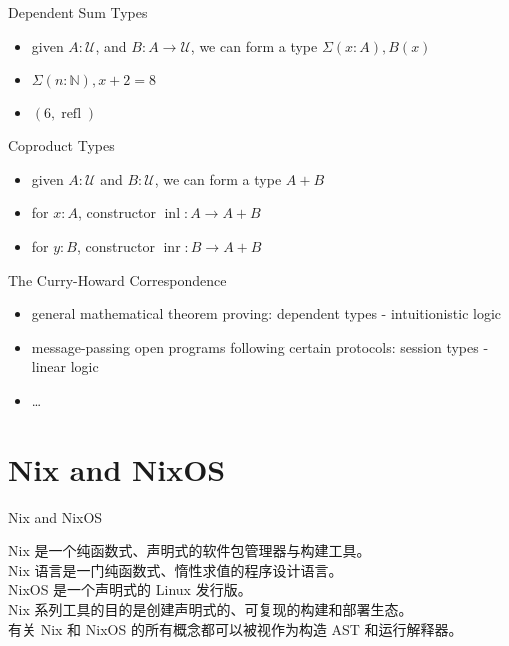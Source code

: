 \documentclass{beamer}
\begin{document}
\begin{frame}{Dependent Sum Types}
\begin{itemize}
    \item given $A : \mathcal U$, and $B : A \to \mathcal U$, we can
    form a type $\Sigma (x : A), B(x)$
    \item $\Sigma (n : \mathbb N), x + 2 = 8$
    \item $(6, \operatorname{refl})$
\end{itemize}
\end{frame}

\begin{frame}{Coproduct Types}
\begin{itemize}
    \item given $A : \mathcal U$ and $B : \mathcal U$, we can form a type $A + B$
    \item for $x : A$, constructor $\operatorname{inl} : A \to A + B$
    \item for $y : B$, constructor $\operatorname{inr} : B \to A + B$
\end{itemize}
\end{frame}

\begin{frame}{The Curry-Howard Correspondence}
\begin{itemize}
    \item general mathematical theorem proving: dependent types - intuitionistic logic
    \item message-passing open programs following certain protocols: session types - linear logic
    \item \ldots
\end{itemize}
\end{frame}

\section{Nix and NixOS}

\begin{frame}{Nix and NixOS}

Nix 是一个纯函数式、声明式的软件包管理器与构建工具。\\
Nix 语言是一门纯函数式、惰性求值的程序设计语言。\\
NixOS 是一个声明式的 Linux 发行版。\\
Nix 系列工具的目的是创建声明式的、可复现的构建和部署生态。\\

有关 Nix 和 NixOS 的所有概念都可以被视作为构造 AST 和运行解释器。

\end{frame}
\end{document}
